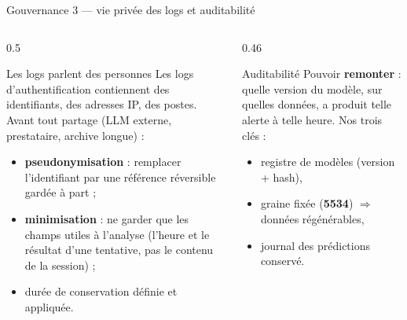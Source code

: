 \begin{frame}{Gouvernance 3 --- vie privée des logs et auditabilité}
\begin{columns}[t]
\begin{column}{0.5\textwidth}
\begin{block}{Les logs parlent des personnes}
Les logs d'authentification contiennent des identifiants, des adresses IP,
des postes. Avant tout partage (LLM externe, prestataire, archive longue) :
\begin{itemize}
\item \textbf{pseudonymisation} : remplacer l'identifiant par une référence
réversible gardée à part ;
\item \textbf{minimisation} : ne garder que les champs utiles à l'analyse
(l'heure et le résultat d'une tentative, pas le contenu de la session) ;
\item durée de conservation définie et appliquée.
\end{itemize}
\end{block}
\end{column}
\begin{column}{0.46\textwidth}
\begin{block}{Auditabilité}
Pouvoir \textbf{remonter} : quelle version du modèle, sur quelles données,
a produit telle alerte à telle heure. Nos trois clés :
\begin{itemize}
\item registre de modèles (version + hash),
\item graine fixée (\textbf{5534}) $\Rightarrow$ données régénérables,
\item journal des prédictions conservé.
\end{itemize}
\end{block}
\end{column}
\end{columns}
\end{frame}

